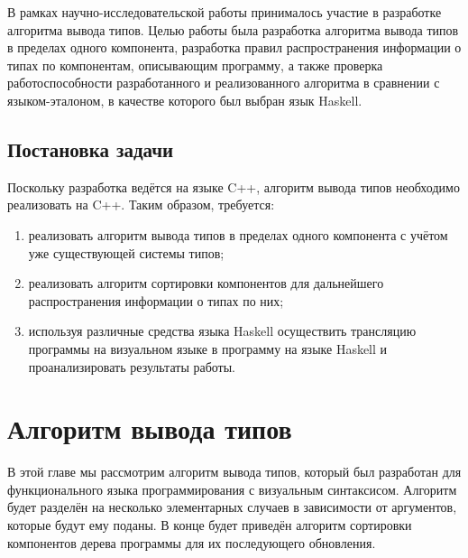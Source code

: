 В рамках научно-исследовательской работы принималось участие в разработке алгоритма вывода типов. Целью работы была разработка алгоритма вывода типов в пределах одного компонента, разработка правил распространения информации о типах по компонентам, описывающим программу, а также проверка работоспособности разработанного и реализованного алгоритма в сравнении с языком-эталоном, в качестве которого был выбран язык Haskell.
\section*{Постановка задачи}
Поскольку разработка ведётся на языке C++, алгоритм вывода типов необходимо реализовать на C++. Таким образом, требуется:
\begin{enumerate}[1)]
	\item реализовать алгоритм вывода типов в пределах одного компонента с учётом уже существующей системы типов;
	\item реализовать алгоритм сортировки компонентов для дальнейшего распространения информации о типах по них;
	\item используя различные средства языка Haskell осуществить трансляцию программы на визуальном языке в программу на языке Haskell и проанализировать результаты работы.
\end{enumerate}

\chapter{Алгоритм вывода типов}\label{type_inf}
В этой главе мы рассмотрим алгоритм вывода типов, который был разработан для функционального языка программирования с визуальным синтаксисом. Алгоритм будет разделён на несколько элементарных случаев в зависимости от аргументов, которые будут ему поданы. В конце будет приведён алгоритм сортировки компонентов дерева программы для их последующего обновления. 
